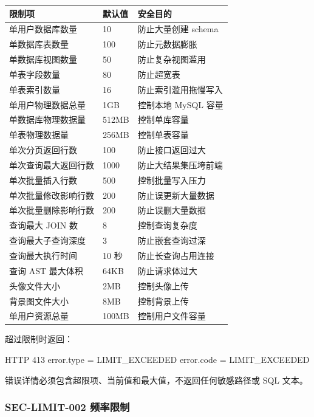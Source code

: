 \documentclass[
  a4paper,
  UTF8]{ctexart}
\newenvironment{Shaded}{}{}
\newcommand{\NormalTok}[1]{#1}
\begin{document}
\begin{longtable}[]{@{}lll@{}}
\toprule
限制项 & 默认值 & 安全目的 \\
\midrule
\endhead
单用户数据库数量 & 10 & 防止大量创建 schema \\
单数据库表数量 & 100 & 防止元数据膨胀 \\
单数据库视图数量 & 50 & 防止复杂视图滥用 \\
单表字段数量 & 80 & 防止超宽表 \\
单表索引数量 & 16 & 防止索引滥用拖慢写入 \\
单用户物理数据总量 & 1GB & 控制本地 MySQL 容量 \\
单数据库物理数据量 & 512MB & 控制单库容量 \\
单表物理数据量 & 256MB & 控制单表容量 \\
单次分页返回行数 & 100 & 防止接口返回过大 \\
单次查询最大返回行数 & 1000 & 防止大结果集压垮前端 \\
单次批量插入行数 & 500 & 控制批量写入压力 \\
单次批量修改影响行数 & 200 & 防止误更新大量数据 \\
单次批量删除影响行数 & 200 & 防止误删大量数据 \\
查询最大 JOIN 数 & 8 & 控制查询复杂度 \\
查询最大子查询深度 & 3 & 防止嵌套查询过深 \\
查询最大执行时间 & 10 秒 & 防止长查询占用连接 \\
查询 AST 最大体积 & 64KB & 防止请求体过大 \\
头像文件大小 & 2MB & 控制头像上传 \\
背景图文件大小 & 8MB & 控制背景上传 \\
单用户资源总量 & 100MB & 控制用户文件容量 \\
\bottomrule
\end{longtable}

超过限制时返回：

\begin{Shaded}
\begin{Highlighting}[]
\NormalTok{HTTP 413}
\NormalTok{error.type = LIMIT\_EXCEEDED}
\NormalTok{error.code = LIMIT\_EXCEEDED}
\end{Highlighting}
\end{Shaded}

错误详情必须包含超限项、当前值和最大值，不返回任何敏感路径或 SQL 文本。

\hypertarget{sec-limit-002-ux9891ux7387ux9650ux5236}{%
\subsubsection{SEC-LIMIT-002
频率限制}\label{sec-limit-002-ux9891ux7387ux9650ux5236}}
\end{document}
